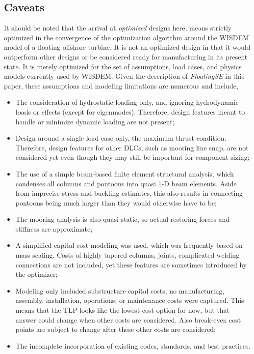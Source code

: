 \subsection{Caveats}
It should be noted that the arrival at \textit{optimized} designs here,
means strictly optimized in the convergence of the optimization
algorithm around the WISDEM model of a floating offshore turbine.  It is
not an optimized design in that it would outperform other designs or be
considered ready for manufacturing in its present state.  It is merely
optimized for the set of assumptions, load cases, and physics models
currently used by WISDEM.  Given the description of \textit{FloatingSE}
in this paper, these assumptions and modeling limitations are numerous
and include,
\begin{itemize}
\item The consideration of hydrostatic loading only, and ignoring
  hydrodynamic loads or effects (except for eigenmodes).  Therefore,
  design features meant to handle or minimize dynamic loading are not
  present;
\item Design around a single load case only, the maximum thrust
  condition.  Therefore, design features for other DLCs, such as mooring
  line snap, are not considered yet even though they may still be
  important for component sizing;
\item The use of a simple beam-based finite element structural analysis,
  which condenses all columns and pontoons into quasi 1-D beam elements.
  Aside from imprecise stress and buckling estimates, this also results in
  connecting pontoons being much larger than they would otherwise have to
  be;
\item The mooring analysis is also quasi-static, so actual restoring
  forces and stiffness are approximate;
\item A simplified capital cost modeling was used, which was frequently
  based on mass scaling.  Costs of highly tapered columns, joints,
  complicated welding connections are not included, yet these features
  are sometimes introduced by the optimizer;
\item Modeling only included substructure capital costs; no manufacturing,
  assembly, installation, operations, or maintenance costs were captured.
  This means that the TLP looks like the lowest cost option for now,
  but that answer could change when other costs are considered.  Also
  break-even cost points are subject to change after these other costs
  are considered;
\item The incomplete incorporation of existing codes, standards, and best
  practices.
\end{itemize}

